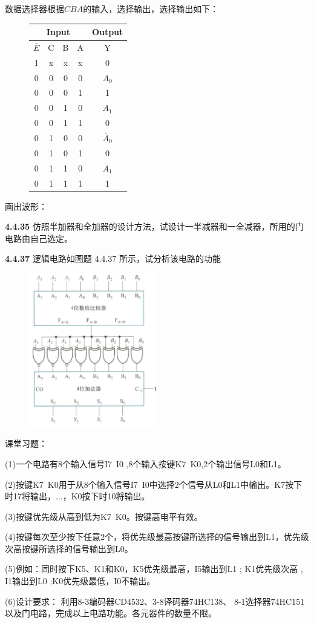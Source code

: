 \documentclass[a4paper,11pt,UTF8]{article}
\begin{document}
数据选择器根据$CBA$的输入，选择输出，选择输出如下：
\begin{figure}[H]
	\centering
	\begin{tabular}{cccc|c}
		\hline
		\multicolumn{4}{c|}{Input} & Output\\
		\hline
		$\overline{E}$ & C & B & A & Y\\
		\hline
		1 & x & x & x & 0\\
		0 & 0 & 0 & 0 & $A_0$\\
		0 & 0 & 0 & 1 & 1\\
		0 & 0 & 1 & 0 & $A_1$\\
		0 & 0 & 1 & 1 & 0\\
		0 & 1 & 0 & 0 & $\overline{A}_0$\\
		0 & 1 & 0 & 1 & 0\\
		0 & 1 & 1 & 0 & $\overline{A}_1$\\
		0 & 1 & 1 & 1 & 1\\
		\hline
	\end{tabular}
\end{figure}

画出波形：

\textbf{4.4.35} 仿照半加器和全加器的设计方法，试设计一半减器和一全减器，所用的门电路由自己选定。

\textbf{4.4.37} 逻辑电路如图题 4.4.37 所示，试分析该电路的功能
\begin{figure}[H]
	\centering
	\includegraphics[width=0.5\textwidth]{4.4.37}
	\caption{}
\end{figure}
课堂习题：

(1)一个电路有8个输入信号I7~I0 ,8个输入按键K7~K0,2个输出信号L0和L1。

(2)按键K7~K0用于从8个输入信号I7~I0中选择2个信号从L0和L1中输出。K7按下时17将输出，...，K0按下时10将输出。

(3)按键优先级从高到低为K7~K0。按键高电平有效。

(4)按键每次至少按下任意2个，将优先级最高按键所选择的信号输出到L1，优先级次高按键所选择的信号输出到L0。

(5)例如：同时按下K5、K1和K0，K5优先级最高，I5输出到L1 ; K1优先级次高 , I1输出到L0 ;K0优先级最低，I0不输出。

(6)设计要求： 利用8-3编码器CD4532、3-8译码器74HC138、 8-1选择器74HC151以及门电路，完成以上电路功能。各元器件的数量不限。
\end{document}
